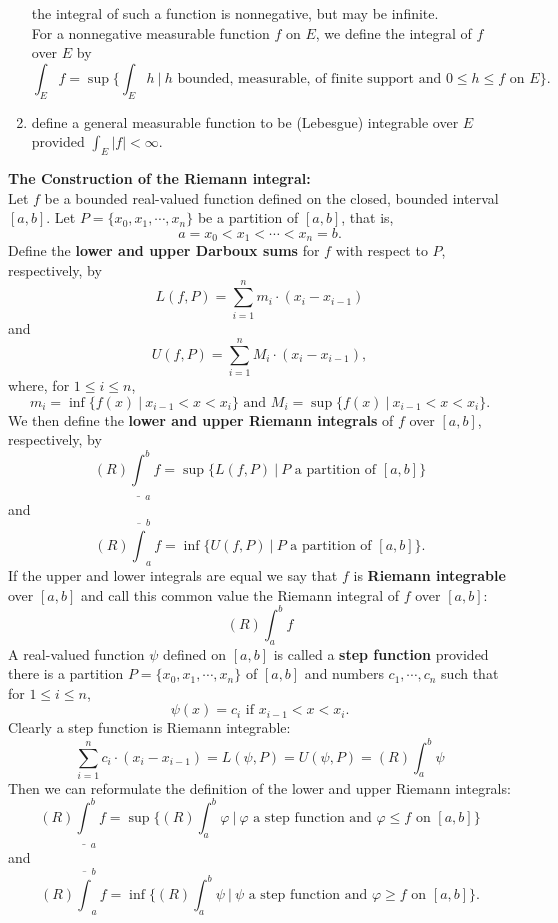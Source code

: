 \begin{flushleft}
\begin{enumerate}
        the integral of such a function is nonnegative, but may be infinite.\\\bigskip
        For a nonnegative measurable function $f$ on $E$, we define the integral of $f$ over $E$ by
        \[
            \int_Ef=\sup\biggl\{\int_Eh\ |\ h\text{ bounded, measurable, of finite support and }0\le h\le f\text{ on }E\biggr\}.
        \]
        \item define a general measurable function to be (Lebesgue) integrable over $E$ provided $\int_E |f|<\infty$.
    \end{enumerate}
    \bigskip \textbf{The Construction of the Riemann integral:}\\\bigskip
    Let $f$ be a bounded real-valued function defined on the closed, bounded interval $[a,b]$.
    Let $P=\{x_0,x_1,\cdots,x_n\}$ be a partition of $[a,b]$, that is,
    \[
        a=x_0<x_1<\cdots<x_n=b.
    \]
    Define the \textbf{lower and upper Darboux sums} for $f$ with respect to $P$, respectively, by
    \[
        L(f,P)=\sum_{i=1}^n m_i\cdot (x_i-x_{i-1})
    \]
    and
    \[
        U(f,P)=\sum_{i=1}^n M_i\cdot (x_i-x_{i-1}),
    \]
    where, for $1\le i\le n$,
    \[
        m_i=\inf\{f(x)\ |\ x_{i-1}<x<x_i\}\text{ and }M_i=\sup\{f(x)\ |\ x_{i-1}<x<x_i\}.
    \]
    We then define the \textbf{lower and upper Riemann integrals} of $f$ over $[a,b]$, respectively, by
    \[
        (R)\underline\int_a^bf=\sup\biggl\{L(f,P)\ |\ P\text{ a partition of }[a,b]\biggr\}
    \]
    and
    \[
        (R)\overline\int_a^bf=\inf\biggl\{U(f,P)\ |\ P\text{ a partition of }[a,b]\biggr\}.
    \]
    If the upper and lower integrals are equal we say that $f$ is \textbf{Riemann integrable} over $[a,b]$ and call this common value the Riemann integral of $f$ over $[a,b]$:
    \[
        (R)\int_a^bf
    \]
    A real-valued function $\psi$ defined on $[a,b]$ is called a \textbf{step function} provided there is a partition $P=\{x_0,x_1,\cdots,x_n\}$ of $[a,b]$ and numbers $c_1,\cdots,c_n$ such that for $1\le i\le n$,
    \[
        \psi(x)=c_i\text{ if }x_{i-1}<x<x_i.
    \]
    Clearly a step function is Riemann integrable:
    \[
        \sum_{i=1}^n c_i\cdot (x_i-x_{i-1})=L(\psi,P)=U(\psi,P)=(R)\int_a^b\psi
    \]
    Then we can reformulate the definition of the lower and upper Riemann integrals:
    \[
        (R)\underline\int_a^bf=\sup\biggl\{(R)\int_a^b\varphi\ |\ \varphi\text{ a step function and }\varphi\le f\text{ on }[a,b]\biggr\}
    \]
    and
    \[
        (R)\overline\int_a^bf=\inf\biggl\{(R)\int_a^b\psi\ |\ \psi\text{ a step function and }\varphi\ge f\text{ on }[a,b]\biggr\}.
\]
\end{flushleft}
